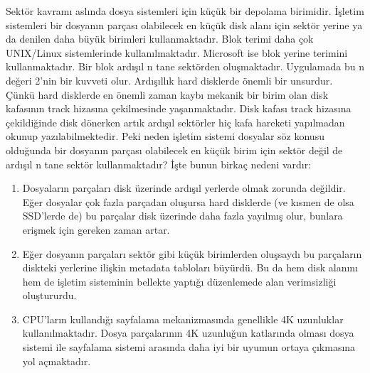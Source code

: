 \documentclass[a4paper,10pt,turkish]{sphinxmanual}
\begin{document}
\sphinxAtStartPar
Sektör kavramı aslında dosya sistemleri için küçük bir depolama birimidir. İşletim sistemleri
bir dosyanın parçası olabilecek en küçük disk alanı için sektör yerine  ya da
 denilen daha büyük birimleri kullanmaktadır. Blok terimi daha çok UNIX/Linux
sistemlerinde kullanılmaktadır. Microsoft ise blok yerine  terimini kullanmaktadır.
Bir blok ardışıl n tane sektörden oluşmaktadır. Uygulamada bu n değeri 2’nin bir kuvveti olur. Ardışıllık hard disklerde
önemli bir unsurdur. Çünkü hard disklerde en önemli zaman kaybı mekanik bir birim olan disk kafasının track hizasına
çekilmesinde yaşanmaktadır. Disk kafası track hizasına çekildiğinde disk dönerken artık ardışıl sektörler hiç kafa
hareketi yapılmadan okunup yazılabilmektedir. Peki neden işletim sistemi dosyalar söz konusu olduğunda bir dosyanın
parçası olabilecek en küçük birim için sektör değil de ardışıl n tane sektör kullanmaktadır? İşte bunun birkaç nedeni
vardır:
\begin{enumerate}
%
\item {} 
\sphinxAtStartPar
Dosyaların parçaları disk üzerinde ardışıl yerlerde olmak zorunda değildir. Eğer dosyalar
çok fazla parçadan oluşursa hard disklerde (ve kısmen de olsa SSD’lerde de) bu parçalar disk
üzerinde daha fazla yayılmış olur, bunlara erişmek için gereken zaman artar.

\item {} 
\sphinxAtStartPar
Eğer dosyanın parçaları sektör gibi küçük birimlerden oluşsaydı bu parçaların diskteki
yerlerine ilişkin metadata tabloları büyürdü. Bu da hem disk alanını hem de işletim sisteminin
bellekte yaptığı düzenlemede alan verimsizliği oluştururdu.

\item {} 
\sphinxAtStartPar
CPU’ların kullandığı sayfalama mekanizmasında genellikle 4K uzunluklar kullanılmaktadır.
Dosya parçalarının 4K uzunluğun katlarında olması dosya sistemi ile sayfalama sistemi arasında
daha iyi bir uyumun ortaya çıkmasına yol açmaktadır.

\end{enumerate}
\end{document}
